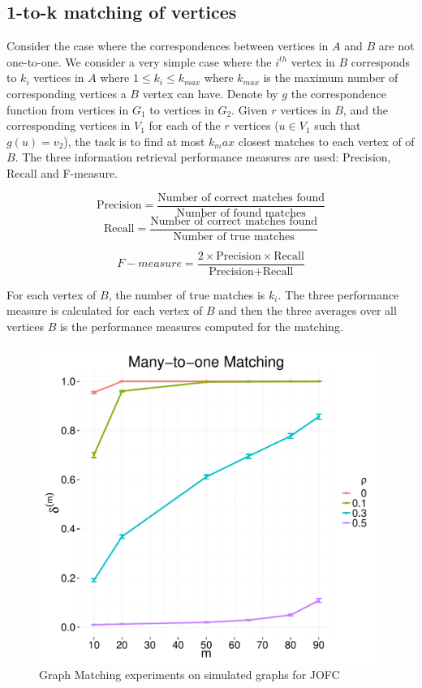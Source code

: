 \documentclass[12pt,oneside,final]{thesis}\usepackage[]{graphicx}\usepackage[]{color}
\begin{document}
\subsection{1-to-k matching of vertices} 

Consider the case where the correspondences between vertices in $A$ and $B$ are not one-to-one. We consider a very simple case where 
the $i^{th}$ vertex in $B$ corresponds to $k_i$ vertices in $A$ where $1\leq k_i \leq k_{max}$ where $k_{max}$ is the maximum number of corresponding vertices a $B$ vertex can have.  Denote by $g$ the correspondence function from vertices in $G_1$ to vertices in $G_2$. Given $r$ vertices in $B$, and the corresponding vertices in $V_1$ for each of the $r$ vertices ($u \in V_1$ such that $g(u)=v_2$), the task is  to find at most $k_max$ closest matches to each vertex of of $B$. 
The three information retrieval performance measures are used: Precision, Recall and F-measure.

$$\mathrm{Precision} =\frac{\textrm{Number of correct matches found}}{\textrm{Number of found matches}}$$
$$\mathrm{Recall}    =\frac{\textrm{Number of correct matches found}}{\textrm{Number of true matches}}$$

$$F-measure  =\frac{2 \times \textrm{Precision} \times \textrm{Recall}}{\textrm{Precision} + \textrm{Recall}}$$

For each vertex of $B$, the number of true matches is $k_i$. The three performance measure is calculated for each vertex of $B$ and then the three averages over all vertices $B$ is the performance measures computed for the  matching.

\begin{figure}
\includegraphics[scale=0.65]{Total_precision_JOFC_1_to_k_match_paper.pdf}
\caption{Graph Matching experiments on simulated graphs for JOFC \label{1_k_graphmatch_sim}}
\end{figure}
\end{document}
